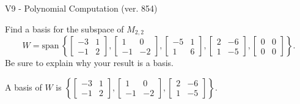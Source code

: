 \begin{exercise}
  \begin{exerciseTitle}V9 - Polynomial Computation (ver. 854)\end{exerciseTitle}
  \begin{exerciseStatement}
    Find a basis for the subspace of \(M_{2,2}\) 
\[W=\mathrm{span}\ \left\{\left[\begin{array}{cc}
-3 & 1 \\
-1 & 2
\end{array}\right] , \left[\begin{array}{cc}
1 & 0 \\
-1 & -2
\end{array}\right] , \left[\begin{array}{cc}
-5 & 1 \\
1 & 6
\end{array}\right] , \left[\begin{array}{cc}
2 & -6 \\
1 & -5
\end{array}\right] , \left[\begin{array}{cc}
0 & 0 \\
0 & 0
\end{array}\right]\right\}.\]
 Be sure to explain why your result is a basis.


  \end{exerciseStatement}
  \begin{exerciseAnswer}
   A basis of \(W\) is  \(\left\{\left[\begin{array}{cc}
-3 & 1 \\
-1 & 2
\end{array}\right] , \left[\begin{array}{cc}
1 & 0 \\
-1 & -2
\end{array}\right] , \left[\begin{array}{cc}
2 & -6 \\
1 & -5
\end{array}\right]\right\}\).
  


  \end{exerciseAnswer}
\end{exercise}